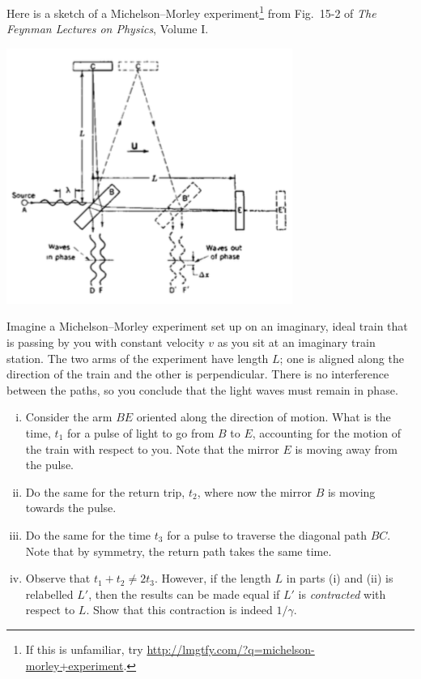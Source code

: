 \documentclass[12pt]{article}
\numberwithin{equation}{section}    %
\begin{document}
Here is a sketch of a Michelson--Morley experiment\footnote{If this is unfamiliar, try \url{http://lmgtfy.com/?q=michelson-morley+experiment}.} from Fig.~15-2 of \emph{The Feynman Lectures on Physics}, Volume I.	
%
\begin{center}
	\includegraphics[width=.3\textwidth]{MMorleyFeynmanLecVolI.png}
	\end{center}
%
Imagine a Michelson--Morley experiment set up on an imaginary, ideal train that is passing by you  with constant velocity $v$ as you sit at an imaginary train station. The two arms of the experiment have length $L$; one is aligned along the direction of the train and the other is perpendicular. There is no interference between the paths, so you conclude that the light waves must remain in phase.
\begin{enumerate}[(i)]
	\item Consider the arm $BE$ oriented along the direction of motion. What is the time, $t_1$ for a pulse of light to go from $B$ to $E$, accounting for the motion of the train with respect to you. Note that the mirror $E$ is moving away from the pulse.
	\item Do the same for the return trip, $t_2$, where now the mirror $B$ is moving towards the pulse.
	\item Do the same for the time $t_3$ for a pulse to traverse the diagonal path $BC$. Note that by symmetry, the return path takes the same time.
	\item Observe that $t_1 + t_2 \neq 2t_3$. However, if the length $L$ in parts (i) and (ii) is relabelled $L'$, then the results can be made equal if $L'$ is \emph{contracted} with respect to $L$. Show that this contraction is indeed $1/\gamma$.
\end{enumerate} 

%
\end{document}
